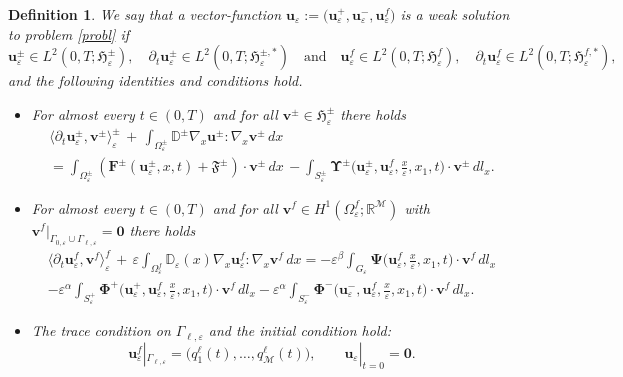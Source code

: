 \documentclass[reqno]{amsart}            %
\newtheorem{definition}{Definition}[section]
\numberwithin{equation}{section}
\begin{document}
	
	\begin{definition}\label{Def-weak-sol}
		We say that a vector-function $\mathbf{u}_\varepsilon := \big(\mathbf{u}^+_\varepsilon, \mathbf{u}^-_\varepsilon, \mathbf{u}^f_\varepsilon \big)$ is a \emph{weak solution} to problem \eqref{probl} if
		$$
		\mathbf{u}^\pm_\varepsilon \in L^2(0,T; \boldsymbol{\mathfrak{H}}^{\pm}_\varepsilon), \quad \partial_t \mathbf{u}^\pm_\varepsilon \in L^2(0,T; \boldsymbol{\mathfrak{H}}^{\pm, *}_\varepsilon) \quad \text{and} \quad 
		\mathbf{u}^f_\varepsilon \in L^2(0,T; \boldsymbol{\mathfrak{H}}^f_\varepsilon), \quad \partial_t\mathbf{u}^f_\varepsilon \in L^2(0,T; \boldsymbol{\mathfrak{H}}^{f, *}_\varepsilon),
		$$
		and the following identities and conditions hold.
		\begin{itemize}
			\item For almost every \(t\in(0,T)\) and for all $\mathbf{v}^\pm \in \boldsymbol{\mathfrak{H}}^{\pm}_\varepsilon$ there holds
			\begin{multline}\label{identity-1}
				\langle\partial_t \mathbf{u}^\pm_\varepsilon, \mathbf{v}^\pm\rangle^\pm_\varepsilon 
				\, + \,  \int_{\Omega^\pm_\varepsilon} \mathbb{D}^\pm\nabla_x\mathbf{u}^\pm :  \nabla_x \mathbf{v}^\pm \, dx 
				\\
				= \int_{\Omega^\pm_\varepsilon} \left(\mathbf{F}^\pm(\mathbf{u}^\pm_\varepsilon, x, t) + \boldsymbol{\mathfrak{F}}^\pm\right) \cdot \mathbf{v}^\pm\, dx  \, - 
				\int_{S^\pm_\varepsilon} \mathbf{\Upsilon}^\pm\big(\mathbf{u}^\pm_\varepsilon,\mathbf{u}^f_\varepsilon, \tfrac{x}{\varepsilon}, x_1, t\big) \cdot \mathbf{v}^\pm\, dl_{x}.
			\end{multline}
			\item For almost every \(t\in(0,T)\) and for all
			\(\mathbf{v}^f\in H^1(\Omega^f_\varepsilon;\mathbb{R}^{\mathcal M})\) with
			\(\mathbf{v}^f|_{\Gamma_{0,\varepsilon}\cup\Gamma_{\ell,\varepsilon}}=\mathbf{0}\) there holds 
			\begin{multline}\label{identity-f}
				\langle\partial_t \mathbf{u}^f_\varepsilon, \mathbf{v}^f\rangle^f_\varepsilon 
				\, + \,  \varepsilon \int_{\Omega^f_\varepsilon}\mathbb{D}_\varepsilon(x)\nabla_x\mathbf{u}^f_\varepsilon :\nabla_x\mathbf{v}^f \, dx = - 
				\varepsilon^\beta \int_{G_\varepsilon} \mathbf{\Psi}\big(\mathbf{u}^f_\varepsilon, \tfrac{x}{\varepsilon}, x_1, t\big) \cdot \mathbf{v}^f\, dl_{x}
				\\
				- 	\varepsilon^\alpha \int_{S^+_\varepsilon} \mathbf{\Phi}^+\big(\mathbf{u}^+_\varepsilon,\mathbf{u}^f_\varepsilon, \tfrac{x}{\varepsilon}, x_1, t\big) \cdot \mathbf{v}^f \, dl_{x}
				- 	\varepsilon^\alpha \int_{S^-_\varepsilon} \mathbf{\Phi}^-\big(\mathbf{u}^-_\varepsilon,\mathbf{u}^f_\varepsilon, \tfrac{x}{\varepsilon}, x_1, t\big) \cdot \mathbf{v}^f \, dl_{x}.
			\end{multline}
			\item The trace condition on \(\Gamma_{\ell,\varepsilon}\) and the initial condition hold: 
			$$
			\mathbf{u}^f_\varepsilon|_{\Gamma_{\ell,\varepsilon}} = \bigl(q_1^\ell(t), \ldots, q_{\mathcal{M}}^\ell(t)\bigr), \qquad
			\mathbf{u}_\varepsilon|_{t=0}=\mathbf{0}.
			$$ 
		\end{itemize}
	\end{definition}
\end{document}
